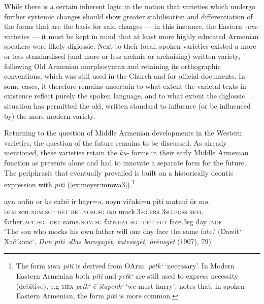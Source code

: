 \documentclass[output=paper,colorlinks,citecolor=brown]{langscibook}
\begin{document}
	While there is a certain inherent logic in the notion that varieties which undergo further systemic changes should show greater stabilisation and differentiation of the forms that are the basis for said changes — in this instance, the Eastern \textit{-um}-varieties — it must be kept in mind that at least more highly educated Armenian speakers were likely diglossic. Next to their local, spoken varieties existed a more or less standardised (and more or less archaic or archaising) written variety, following Old Armenian morphosyntax and retaining its orthographic conventions, which was still used in the Church and for official documents. In some cases, it therefore remains uncertain to what extent the varietal texts in existence reflect purely the spoken language, and to what extent the diglossic situation has permitted the old, written standard to influence (or be influenced by) the more modern variety.
	
	Returning to the question of Middle Armenian developments in the Western varieties, the question of the future remains to be discussed. As already mentioned, these varieties retain the \textit{ku-} forms in their early Middle Armenian function as presents alone and had to innovate a separate form for the future. The periphrasis that eventually prevailed is built on a historically deontic expression with \textit{piti} (\ref{ex:meyer:mmwa3}).\footnote{The form \textsc{mwa} \textit{piti} is derived from OArm. \textit{pētk‘} ‘necessary’. In Modern Eastern Armenian both \textit{piti} and \textit{petk‘} are still used to express necessity (debitive), e.g  \textsc{mea} \textit{petk‘ ē štapenk‘} ‘we must hurry’; \citet[263–271]{DumTragut2009} notes that, in spoken Eastern Armenian, the form \textit{piti} is more common.}
	
	\ea \label{ex:meyer:mmwa3}
	\gll ayn ordin or kə całrē ir hayr=ə, noyn vičaki=n piti matnui ōr mə.\\
	\textsc{dem} son.\textsc{nom.sg=det} \textsc{rel.nom.sg} \textsc{ind} mock.\textsc{3sg.prs} \textsc{3sg.poss.refl} father.\textsc{acc.sg=det} same.\textsc{nom.sg} fate.\textsc{dat.sg=det} \textsc{fut} face.3sg day \textsc{indf}\\	
	\glt ‘The son who mocks his own father will one day face the same fate.’ (Dawit‘ Xač‘konc‘, \textit{Dun piti əllas baroyagēt, tntesagēt, ōrēnsgēt} (1907), 79)
	\z {}
	
\end{document}
